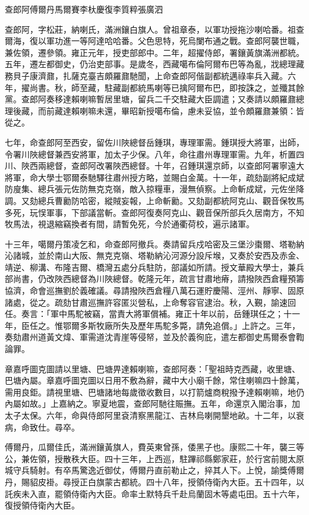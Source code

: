 
\begin{pinyinscope}
查郎阿傅爾丹馬爾賽李杕慶復李質粹張廣泗

查郎阿，字松莊，納喇氏，滿洲鑲白旗人。曾祖章泰，以軍功授拖沙喇哈番。祖查爾海，復以軍功進一等阿達哈哈番。父色思特，死烏闌布通之戰。查郎阿襲世職，兼佐領，遷參領。雍正元年，授吏部郎中。二年，超擢侍郎，署鑲黃旗滿洲都統。五年，遷左都御史，仍治吏部事。是歲冬，西藏噶布倫阿爾布巴等為亂，戕總理藏務貝子康濟鼐，扎薩克臺吉頗羅鼐馳聞，上命查郎阿偕副都統邁祿率兵入藏。六年，擢尚書。秋，師至藏，駐藏副都統馬喇等已擒阿爾布巴，即按誅之，並殲其餘黨。查郎阿奏移達賴喇嘛暫居里塘，留兵二千交駐藏大臣調遣；又奏請以頗羅鼐總理後藏，而前藏達賴喇嘛未還，畢昭新授噶布倫，慮未妥協，並令頗羅鼐兼領：皆從之。

七年，命查郎阿至西安，留佐川陜總督岳鍾琪，專理軍需。鍾琪授大將軍，出師，令署川陜總督兼西安將軍，加太子少保。八年，命往肅州專理軍需。九年，析置四川、陜西兩總督，查郎阿改署陜西總督。十年，召鍾琪還京師，以查郎阿署寧遠大將軍，命大學士鄂爾泰馳驛往肅州授方略，並賜白金萬。十一年，疏劾副將紀成斌防廋集、總兵張元佐防無克克嶺，敵入掠糧車，漫無偵察。上命斬成斌，元佐坐降調。又劾總兵曹勷防哈密，縱賊妄報，上命斬勷。又劾副都統阿克山、觀音保牧馬多死，玩悮軍事，下部議當斬。查郎阿復奏阿克山、觀音保所部兵久居南方，不知牧馬法，視退縮竊換者有間，請暫免死，今於通衢荷校，遍示諸軍。

十三年，噶爾丹策凌乞和，命查郎阿撤兵。奏請留兵戍哈密及三堡沙棗爾、塔勒納沁諸城，並於南山大阪、無克克嶺、塔勒納沁河源分設斥堠，又奏於安西及赤金、靖逆、柳溝、布隆吉爾、橋灣五處分兵駐防，部議如所請。授文華殿大學士，兼兵部尚書，仍改陜西總督為川陜總督。乾隆元年，疏言甘肅地瘠，請撥陜西倉糧預籌協濟，命會巡撫劉於義確議。尋請撥陜西倉糧八萬石運貯慶陽、涇州、靜寧、固原諸處，從之。疏劾甘肅巡撫許容匿災營私，上命奪容官逮治。秋，入覲，諭速回任。奏言：「軍中馬駝被竊，當責大將軍償補。雍正十年以前，岳鍾琪任之；十一年，臣任之。惟鄂爾多斯牧廠所失及歷年馬駝多斃，請免追償。」上許之。三年，奏劾肅州道黃文煒、軍需道沈青崖等侵帑，並及於義徇庇，遣左都御史馬爾泰會鞫論罪。

章嘉呼圖克圖請以里塘、巴塘畀達賴喇嘛，查郎阿奏：「聖祖時克西藏，收里塘、巴塘內屬。章嘉呼圖克圖以日用不敷為辭，藏中大小廟千餘，常住喇嘛四十餘萬，需用良鉅。請視里塘、巴塘諸地每歲徵收數目，以打箭爐商稅撥予達賴喇嘛，地仍內屬如故。」上嘉納之。寧夏地震，查郎阿馳往賑撫。五年，命還京入閣治事，加太子太保。六年，命與侍郎阿里袞清察黑龍江、吉林烏喇開墾地畝。十二年，以衰病，命致仕。尋卒。

傅爾丹，瓜爾佳氏，滿洲鑲黃旗人，費英東曾孫，倭黑子也。康熙二十年，襲三等公，兼佐領，授散秩大臣。四十三年，上西巡，駐蹕祁縣鄭家莊，於行宮前閱太原城守兵騎射。有卒馬驚逸近御仗，傅爾丹直前勒止之，捽其人下。上悅，諭獎傅爾丹，賜貂皮褂。尋授正白旗蒙古都統。四十八年，授領侍衛內大臣。五十四年，以託疾未入直，罷領侍衛內大臣。命率土默特兵千赴烏蘭固木等處屯田。五十六年，復授領侍衛內大臣。


\end{pinyinscope}
